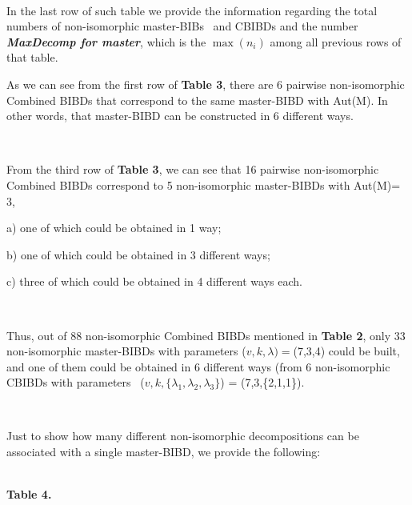 \documentclass{article}
\newcommand{\nobracket}{}
\newcommand{\tmem}[1]{{\em #1\/}}
\newcommand{\tmstrong}[1]{\textbf{#1}}
\newenvironment{tmparmod}[3]{\begin{list}{}{\setlength{\topsep}{0pt}\setlength{\leftmargin}{#1}\setlength{\rightmargin}{#2}\setlength{\parindent}{#3}\setlength{\listparindent}{\parindent}\setlength{\itemindent}{\parindent}\setlength{\parsep}{\parskip}} \item[]}{\end{list}}
\begin{document}
\

\begin{tmparmod}{0pt}{0pt}{0tab}%
  In the last row of such table we provide the information regarding the total
  numbers of non-isomorphic master-BIBs \ and CBIBDs and the number
  {\tmem{{\tmstrong{MaxDecomp for master}}}}, which is the $\max (n {}_i)$
  among all previous rows of that table.
\end{tmparmod}



\begin{tmparmod}{0pt}{0pt}{0tab}%
  As we can see from the first row of {\tmstrong{Table 3}}, there are 6
  pairwise non-isomorphic Combined BIBDs that correspond to the same
  master-BIBD with \textbar Aut(M). In other words, that
  master-BIBD can be constructed in 6 different ways. \
  
  \
  
  From the third row of {\tmstrong{Table 3}}, we can see that 16 pairwise
  non-isomorphic Combined BIBDs correspond to 5 non-isomorphic master-BIBDs
  with \textbar Aut(M)\textbar  = 3,
  
  \quad a) one of which could be obtained in 1 way;
  
  \quad b) one of which could be obtained in 3 different ways;
  
  \quad c) three of which could be obtained in 4 different ways each.
  
  \
  
  Thus, out of 88 non-isomorphic Combined BIBDs mentioned in {\tmstrong{Table
  2}}, only 33 non-isomorphic master-BIBDs with parameters ($v, k, \nobracket
  \lambda ) =$(7,3,4) could be built, and one of them could be obtained in 6
  different ways (from 6 non-isomorphic CBIBDs with parameters \ ($v, k, \{
  \lambda {}_1, \lambda {}_2, \lambda {}_3 \}$) =  (7,3,\{2,1,1\}).
  
  \
  
  Just to show how many different non-isomorphic decompositions can be
  associated with a single master-BIBD, we provide the following: 
\end{tmparmod}

{\tmstrong{\\
Table 4.}}{\tmstrong{}}
\end{document}
